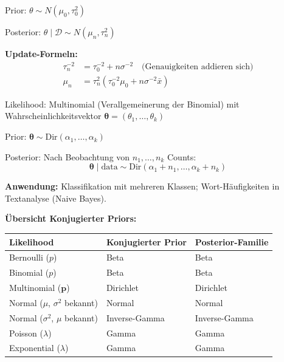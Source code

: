 Prior: $\theta \sim N(\mu_0, \tau_0^2)$

Posterior: $\theta \mid \mathcal{D} \sim N(\mu_n, \tau_n^2)$

\textbf{Update-Formeln:}
\begin{align*}
\tau_n^{-2} &= \tau_0^{-2} + n\sigma^{-2} \quad \text{(Genauigkeiten addieren sich)} \\
\mu_n &= \tau_n^2 \left( \tau_0^{-2} \mu_0 + n\sigma^{-2} \bar{x} \right)
\end{align*}

Likelihood: Multinomial (Verallgemeinerung der Binomial) mit Wahrscheinlichkeitsvektor $\boldsymbol{\theta} = (\theta_1, \ldots, \theta_k)$

Prior: $\boldsymbol{\theta} \sim \text{Dir}(\alpha_1, \ldots, \alpha_k)$

Posterior: Nach Beobachtung von $n_1, \ldots, n_k$ Counts:
$$\boldsymbol{\theta} \mid \text{data} \sim \text{Dir}(\alpha_1 + n_1, \ldots, \alpha_k + n_k)$$

\textbf{Anwendung:} Klassifikation mit mehreren Klassen; Wort-Häufigkeiten in Textanalyse (Naive Bayes).

\textbf{Übersicht Konjugierter Priors:}
\begin{table}[h]
    \centering
    \small
    \begin{tabular}{|l|l|l|}
        \hline
        \textbf{Likelihood} & \textbf{Konjugierter Prior} & \textbf{Posterior-Familie} \\
        \hline
        Bernoulli ($p$) & Beta & Beta \\
        \hline
        Binomial ($p$) & Beta & Beta \\
        \hline
        Multinomial ($\boldsymbol{p}$) & Dirichlet & Dirichlet \\
        \hline
        Normal ($\mu$, $\sigma^2$ bekannt) & Normal & Normal \\
        \hline
        Normal ($\sigma^2$, $\mu$ bekannt) & Inverse-Gamma & Inverse-Gamma \\
        \hline
        Poisson ($\lambda$) & Gamma & Gamma \\
        \hline
        Exponential ($\lambda$) & Gamma & Gamma \\
        \hline
    \end{tabular}
\end{table}


